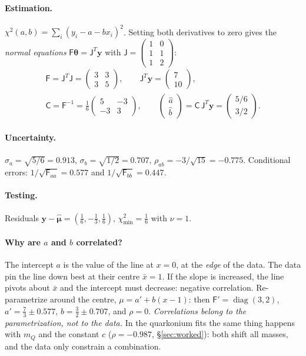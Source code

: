 \documentclass[11pt,a4paper]{article}
\numberwithin{equation}{section}
\theoremstyle{definition}
\theoremstyle{plain}
\theoremstyle{remark}
\numberwithin{algorithm}{section}
\newcommand{\diag}{\operatorname{diag}}
\newcommand{\sJ}{\mathsf J}
\newcommand{\sF}{\mathsf F}
\newcommand{\sC}{\mathsf C}
\newcommand{\vth}{\bm\theta}
\begin{document}
\paragraph{Estimation.} $\chi^2(a,b)=\sum_i(y_i-a-bx_i)^2$. Setting both derivatives to zero gives the \emph{normal equations} $\sF\vth=\sJ^T\bm y$ with $\sJ=\begin{pmatrix}1&0\\1&1\\1&2\end{pmatrix}$:
\begin{gather*}
\sF=\sJ^T\sJ=\begin{pmatrix}3&3\\3&5\end{pmatrix},\qquad \sJ^T\bm y=\begin{pmatrix}7\\10\end{pmatrix},\\
\sC=\sF^{-1}=\frac16\begin{pmatrix}5&-3\\-3&3\end{pmatrix},\qquad
\begin{pmatrix}\hat a\\\hat b\end{pmatrix}=\sC\,\sJ^T\bm y=\begin{pmatrix}5/6\\3/2\end{pmatrix}.
\end{gather*}
\paragraph{Uncertainty.} $\sigma_a=\sqrt{5/6}=0.913$, $\sigma_b=\sqrt{1/2}=0.707$, $\rho_{ab}=-3/\sqrt{15}=-0.775$. Conditional errors: $1/\sqrt{\sF_{aa}}=0.577$ and $1/\sqrt{\sF_{bb}}=0.447$.
\paragraph{Testing.} Residuals $\bm y-\hat{\bm\mu}=(\frac16,-\frac13,\frac16)$, $\chi^2_{\min}=\frac16$ with $\nu=1$.

\paragraph{Why are $a$ and $b$ correlated?} The intercept $a$ is the value of the line at $x=0$, at the \emph{edge} of the data. The data pin the line down best at their centre $\bar x=1$. If the slope is increased, the line pivots about $\bar x$ and the intercept must decrease: negative correlation. Re-parametrize around the centre, $\mu=a'+b(x-1)$: then $\sF'=\diag(3,2)$, $a'=\frac73\pm0.577$, $b=\frac32\pm0.707$, and $\rho=0$. \emph{Correlations belong to the parametrization, not to the data.} In the quarkonium fits the same thing happens with $m_Q$ and the constant $c$ ($\rho=-0.987$, \S\ref{sec:worked}): both shift all masses, and the data only constrain a combination.
\end{document}
